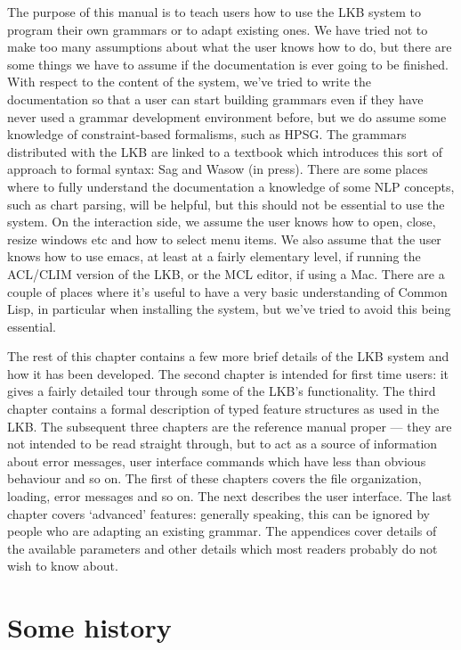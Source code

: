 \documentclass[12pt]{report}
\begin{document}
The purpose of this manual is to teach users how to use the LKB system
to program their own grammars or to adapt existing ones.
We have tried not to make too many assumptions
about what the user knows how to do, but there are some things we have 
to assume if the documentation is ever going to be finished.
With respect to the content of the system, we've tried to write the 
documentation so that a user can start building grammars even if
they have never used a grammar development environment before,
but we do assume some knowledge of constraint-based formalisms,
such as HPSG.  The grammars distributed with the LKB are
linked to a textbook which introduces this sort of approach
to formal syntax: Sag and Wasow (in press).
There are some places where to fully understand
the documentation a knowledge of some NLP concepts, such as chart parsing,
will be helpful, but this should not be essential to use the system.
On the interaction side,
we assume the user knows how to open, close, resize windows etc
and how to select menu items.  We also assume that the user knows
how to use emacs, at least at a fairly elementary level, if running
the ACL/CLIM version of the LKB, or the MCL editor, if using a Mac.
There are a couple of places where it's useful to have a 
very basic understanding of Common Lisp, in particular when installing the
system, but we've tried to avoid this being essential.
 
The rest of this chapter contains a few more brief details
of the LKB system and how it has been developed.
The second chapter is intended for first time users: it gives
a fairly detailed tour through some of the LKB's functionality.
The third chapter contains a formal description
of typed feature structures as used in the LKB.
The subsequent three chapters are the reference manual proper --- they
are not intended to be read straight through, but to act as 
a source of information about error messages,
user interface commands which have less than
obvious behaviour and so on.
The first of these chapters
covers the
file organization, loading, error messages and so on.  The
next describes the user interface.  The last chapter
covers `advanced' features: generally speaking, this can be
ignored by people who are adapting an existing grammar.
The appendices cover details of the
available parameters and other details which most readers probably
do not wish to know about.

\section{Some history}
\end{document}
